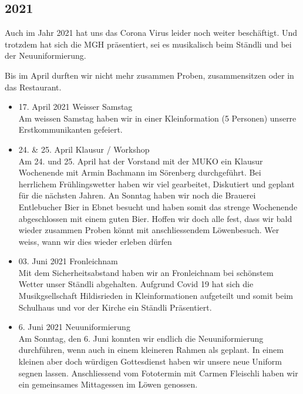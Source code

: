 
\subsection*{2021}
\begin{history}

    Auch im Jahr 2021 hat uns das Corona Virus leider noch weiter beschäftigt.
    Und trotzdem hat sich die MGH präsentiert, sei es musikalisch beim Ständli und bei der
    Neuuniformierung.

    Bis im April durften wir nicht mehr zusammen Proben, zusammensitzen oder in
    das Restaurant.

    \begin{itemize}

        \item 17. April 2021 Weisser Samstag\\
              Am weissen Samstag haben wir in einer Kleinformation (5 Personen)
              unserre Erstkommunikanten gefeiert.

        \item 24. \& 25. April Klausur / Workshop\\
              Am 24. und 25. April hat der Vorstand mit der MUKO ein Klausur
              Wochenende mit Armin Bachmann im Sörenberg durchgeführt. Bei
              herrlichem Frühlingswetter haben wir viel gearbeitet, Diskutiert
              und geplant für die nächsten Jahren. An Sonntag haben wir noch die
              Brauerei Entlebucher Bier in Ebnet besucht und haben somit das
              strenge Wochenende abgeschlossen mit einem guten Bier. Hoffen wir
              doch alle fest, dass wir bald wieder zusammen Proben könnt mit
              anschliessendem Löwenbesuch. Wer weiss, wann wir dies wieder
              erleben dürfen

        \item 03. Juni 2021 Fronleichnam\\
              Mit dem Sicherheitsabstand haben wir an Fronleichnam bei schönstem Wetter unser Ständli
              abgehalten. Aufgrund Covid 19 hat sich die Musikgsellschaft Hildisrieden in Kleinformationen
              aufgeteilt und somit beim Schulhaus und vor der Kirche ein Ständli Präsentiert.

        \item 6. Juni 2021 Neuuniformierung\\
              Am Sonntag, den 6. Juni konnten wir endlich die Neuuniformierung durchführen, wenn auch
              in einem kleineren Rahmen als geplant. In einem kleinen aber doch würdigen Gottesdienst
              haben wir unsere neue Uniform segnen lassen. Anschliessend vom Fototermin mit Carmen
              Fleischli haben wir ein gemeinsames Mittagessen im Löwen genossen.


\end{itemize}
\end{history}
